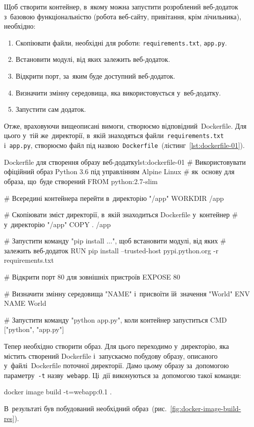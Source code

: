 \documentclass[
	a4paper,
	oneside,
	BCOR = 10mm,
	DIV = 12,
	12pt,
	headings = normal,
]{scrartcl}
\newcommand{\filename}[1]{\texttt{#1}}
\newcommand{\progname}[1]{\texttt{#1}}
\begin{document}
					Щоб створити контейнер, в~якому можна запустити розроблений веб-додаток з~базовою функціональністю (робота веб-сайту, привітання, крім лічильника), необхідно:
					\begin{enumerate}
						\item Скопіювати файли, необхідні для роботи: \filename{\textenglish{requirements.txt}}, \filename{\textenglish{app.py}}.
						\item Встановити модулі, від яких залежить веб-додаток.
						\item Відкрити порт, за~яким буде доступний веб-додаток.
						\item Визначити змінну середовища, яка використовується у~веб-додатку.
						\item Запустити сам додаток.
					\end{enumerate}
					Отже, враховуючи вищеописані вимоги, створюємо відповідний~\textenglish{Dockerfile}. Для цього у~тій же~директорії, в~якій знаходяться файли~\filename{\textenglish{requirements.txt}} і~\filename{\textenglish{app.py}}, створюємо файл під назвою~\filename{\textenglish{Dockerfile}}~(лістинг~\ref{lst:dockerfile-01}).

					\begin{listingdocker}{\textenglish{Dockerfile} для створення образу веб-додатку}{lst:dockerfile-01}
						# Використовувати офіційний образ Python 3.6 під управлінням Alpine Linux
						# як~основу для образа, що~буде створений
						FROM python:2.7-slim

						# Всередині контейнера перейти в~директорію "/app"
						WORKDIR /app

						# Скопіювати зміст директорії, в~якій знаходиться Dockerfile у~контейнер
						# у~директорію "/app"
						COPY . /app

						# Запустити команду "pip install ...", щоб встановити модулі, від яких
						# залежить веб-додаток
						RUN pip install --trusted-host pypi.python.org -r requirements.txt

						# Відкрити порт 80 для зовнішніх пристроїв
						EXPOSE 80

						# Визначити змінну середовища "NAME" і~присвоїти їй~значення "World"
						ENV NAME World

						# Запустити команду "python app.py", коли контейнер запуститься
						CMD ["python", "app.py"]
					\end{listingdocker}

					Тепер необхідно створити образ. Для цього переходимо у~директорію, яка містить створений \textenglish{Dockerfile} і~запускаємо побудову образу, описаного у~файлі~\textenglish{Dockerfile} поточної директорії. Дамо цьому образу за~допомогою параметру~\verb|-t| назву~\progname{webapp}. Ці~дії виконуються за~допомогою такої команди:
					\begin{bashterm}
						docker image build -t=webapp:0.1 .
					\end{bashterm}
					В~результаті був побудований необхідний образ~(рис.~\ref{fig:docker-image-build-res}).
\end{document}
